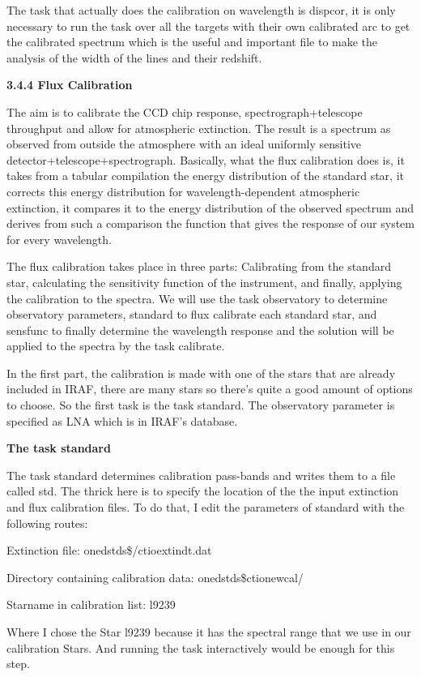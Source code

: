 \documentclass[english]{article}
\begin{document}
The task that actually does the calibration on wavelength is dispcor, it is only necessary to run the task over all the targets with their own calibrated arc to get the calibrated spectrum which is the useful and important file to make the analysis of the width of the lines and their redshift.

\textbf{{\large 3.4.4 Flux Calibration}}

The aim is to calibrate the CCD chip response, spectrograph+telescope throughput and allow for atmospheric extinction. The result is a spectrum as observed from outside the atmosphere with an ideal uniformly sensitive detector+telescope+spectrograph. Basically, what the flux calibration does is, it takes from a tabular compilation the energy distribution of the standard star, it corrects this energy distribution for wavelength-dependent atmospheric extinction, it compares it to the energy distribution of the observed spectrum and derives from such a comparison the function that gives the response of our system for every wavelength.

The flux calibration takes place in three parts: Calibrating from the standard star, calculating the sensitivity function of the instrument, and finally, applying the calibration to the spectra. We will use the task observatory to determine observatory parameters, standard to flux calibrate each standard star, and sensfunc to finally determine the wavelength response and the solution will be applied to the spectra by the task calibrate.

In the first part, the calibration is made with one of the stars that are already included in IRAF, there are many stars so there's quite a good amount of options to choose. So the first task is the task standard. The observatory parameter is specified as LNA which is in IRAF's database. 

\textbf{The task standard}

The task standard determines calibration pass-bands and writes them to a file called std. The thrick here is to specify the location of the the input extinction and flux calibration files. To do that, I edit the parameters of standard with the following routes:

Extinction file:                              onedstds\$/ctioextindt.dat

Directory containing calibration data:   onedstds\$ctionewcal/

Starname in calibration list:                l9239

Where I chose the Star l9239 because it has the spectral range that we use in our calibration Stars. And running the task interactively would be enough for this step.
\end{document}
